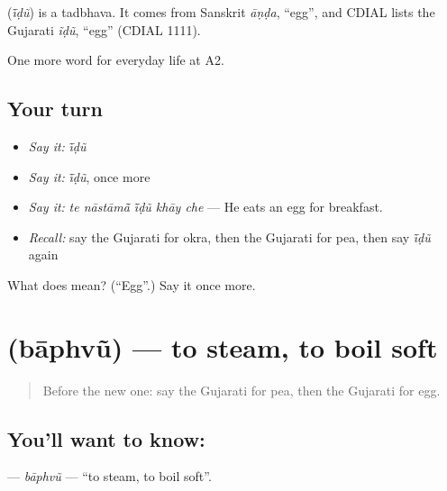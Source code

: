 \begin{cousinweb}
\textbf{} (\emph{ī̃ḍũ}) is a tadbhava. It comes from Sanskrit \emph{āṇḍa}, \textquotedblleft{}egg\textquotedblright{}, and CDIAL lists the Gujarati \emph{ĩḍũ}, \textquotedblleft{}egg\textquotedblright{} (CDIAL 1111).
\end{cousinweb}

\begin{grammarlens}[title={What you've built}]
One more word for everyday life at A2.
\end{grammarlens}

\subsection*{Your turn}
\begin{itemize}
\raggedright
  \item \emph{Say it:} \emph{ī̃ḍũ}
  \item \emph{Say it:} \emph{ī̃ḍũ}, once more
  \item \emph{Say it:} \emph{te nāstāmā̃ ī̃ḍũ khāy che} — He eats an egg for breakfast.
  \item \emph{Recall:} say the Gujarati for okra, then the Gujarati for pea, then say \emph{ī̃ḍũ} again
\end{itemize}

\begin{tcolorbox}[breakable,colback=teal!4,colframe=teal!35!black,title={Before you move on}]
What does  mean? (\textquotedblleft{}Egg\textquotedblright{}.) Say it once more.
\end{tcolorbox}
\section[\texorpdfstring{\gu{બાફવું} (bāphvũ)}{બાફવું (bāphvũ)}]{ (bāphvũ) — to steam, to boil soft}

\label{lesson:GU-C167-baphvu}



\begin{quote}
Before the new one: say the Gujarati for pea, then the Gujarati for egg.
\end{quote}

\subsection*{You'll want to know: }
\textbf{} — \emph{bāphvũ} — \textquotedblleft{}to steam, to boil soft\textquotedblright{}.

